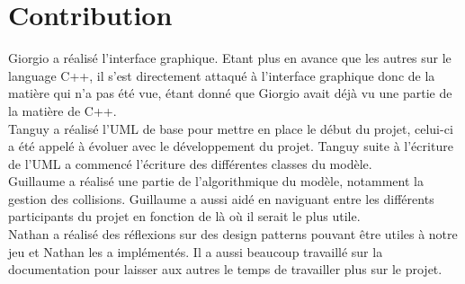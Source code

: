 \section{Contribution}

Giorgio a réalisé l'interface graphique. Etant plus en avance que les autres sur le language C++, il s'est directement attaqué à l'interface graphique donc de la matière qui n'a pas été vue, étant donné que Giorgio avait déjà vu une partie de la matière de C++.
\\

Tanguy a réalisé  l'UML de base pour mettre en place le début du projet, celui-ci a été appelé à évoluer avec le développement du projet. Tanguy suite à l'écriture de l'UML a commencé l'écriture des différentes classes du modèle.\\

Guillaume a réalisé une partie de l'algorithmique du modèle, notamment la gestion des collisions. Guillaume a aussi aidé en naviguant entre les différents participants du projet en fonction de là où il serait le plus utile.\\

Nathan a réalisé des réflexions sur des design patterns pouvant être utiles à notre jeu et Nathan les a implémentés. Il a aussi beaucoup travaillé sur la documentation pour laisser aux autres le temps de travailler plus sur le projet.\\
